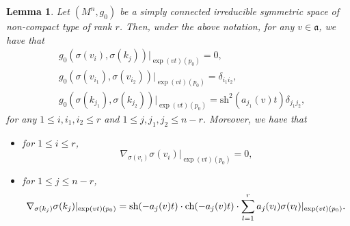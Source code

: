 \documentclass[12pt]{amsart}
\newtheorem{lemma}{Lemma}[section]
\begin{document}
\begin{lemma}\label{spherical frame}
    Let $(M^n, g_0)$ be a simply connected irreducible symmetric space of non-compact type of rank $r$. Then, under the above notation, for any $v\in \mathfrak{a}$, we have that 
    \begin{equation}\label{orthonormal basis on radius}
        \begin{split}
            &g_0(\sigma(v_i), \sigma(k_j))|_{\exp(v t)(p_0)} = 0,\\
            &g_0(\sigma(v_{i_1}),\sigma(v_{i_2}))|_{\exp(vt)(p_0)} = \delta_{i_1i_2},\\
            &g_0(\sigma(k_{j_1}), \sigma(k_{j_2}))|_{\exp(vt)(p_0)} = \mathrm{sh}^2(a_{j_1}(v)t)\delta_{j_1j_2},
        \end{split}
    \end{equation}
    for any $1\leq i, i_1, i_2 \leq r$ and $1 \leq j, j_1, j_2 \leq n - r$. Moreover, we have that 
    \begin{itemize}
        \item for $1 \leq i \leq r$,
        \begin{equation}\label{covariant derivative on radius 1}
            \nabla_{\sigma(v_i)}\sigma(v_i)|_{\exp(vt)(p_0)} = 0,
        \end{equation}
        \item for $1 \leq j \leq n - r$,
        \begin{equation}\label{covariant derivative on radius 2}
            \nabla_{\sigma(k_j)}\sigma(k_j)|_{\exp(vt)(p_0)}\\ 
            = \mathrm{sh}(-a_j(v)t)\cdot \mathrm{ch}(-a_j(v)t)\cdot \sum_{l = 1}^{r}a_j(v_l)\sigma(v_l)|_{\exp(vt)(p_0)}. 
        \end{equation}
    \end{itemize}
\end{lemma}
\end{document}
